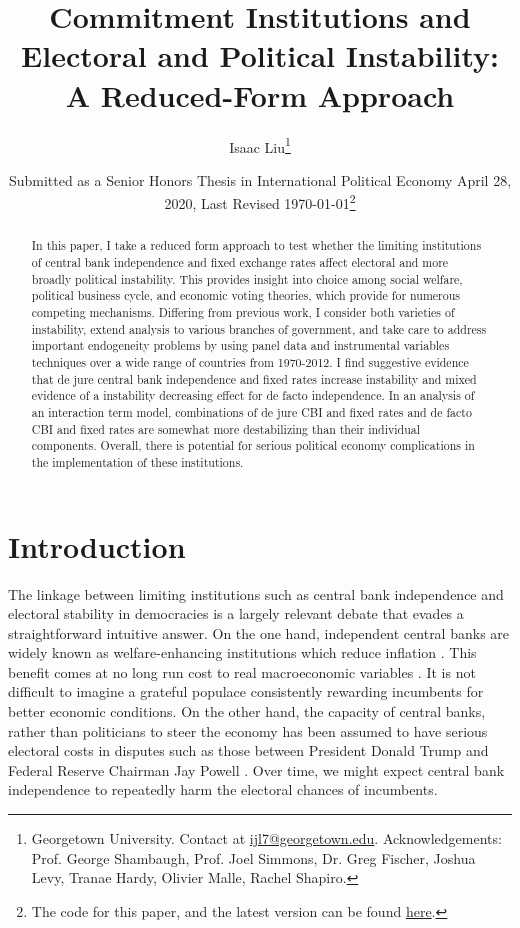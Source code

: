 \documentclass{article}
\title{Commitment Institutions and Electoral and Political Instability: A Reduced-Form Approach}
\author{Isaac Liu\thanks{Georgetown University. Contact at \href{mailto:ijl7@georgetown.edu}{ijl7@georgetown.edu}. Acknowledgements: Prof. George Shambaugh, Prof. Joel Simmons, Dr. Greg Fischer, Joshua Levy, Tranae Hardy, Olivier Malle, Rachel Shapiro.}}
\date{Submitted as a Senior Honors Thesis in International Political Economy April 28, 2020, \newline Last Revised \today \footnote{The code for this paper, and the latest version can be found \href{https://github.com/ijyliu/Commitment_Institutions_Instability}{here}.}}
\begin{document}
	\maketitle

    \begin{abstract}
        In this paper, I take a reduced form approach to test whether the limiting institutions of central bank independence and fixed exchange rates affect electoral and more broadly political instability. This provides insight into choice among social welfare, political business cycle, and economic voting theories, which provide for numerous competing mechanisms. Differing from previous work, I consider both varieties of instability, extend analysis to various branches of government, and take care to address important endogeneity problems by using panel data and instrumental variables techniques over a wide range of countries from 1970-2012. I find suggestive evidence that de jure central bank independence and fixed rates increase instability and mixed evidence of a instability decreasing effect for de facto independence. In an analysis of an interaction term model, combinations of de jure CBI and fixed rates and de facto CBI and fixed rates are somewhat more destabilizing than their individual components. Overall, there is potential for serious political economy complications in the implementation of these institutions.
    \end{abstract}

    \clearpage
    \newpage

    \section*{Introduction}

    The linkage between limiting institutions such as central bank independence and electoral stability in democracies is a largely relevant debate that evades a straightforward intuitive answer. On the one hand, independent central banks are widely known as welfare-enhancing institutions which reduce inflation \citep{chicago_booth_initiative_on_global_markets_fed_2019}. This benefit comes at no long run cost to real macroeconomic variables \citep{alesina_political_1997}. It is not difficult to imagine a grateful populace consistently rewarding incumbents for better economic conditions. On the other hand, the capacity of central banks, rather than politicians to steer the economy has been assumed to have serious electoral costs in disputes such as those between President Donald Trump and Federal Reserve Chairman Jay Powell \citep{long_federal_2019}. Over time, we might expect central bank independence to repeatedly harm the electoral chances of incumbents.
\end{document}
